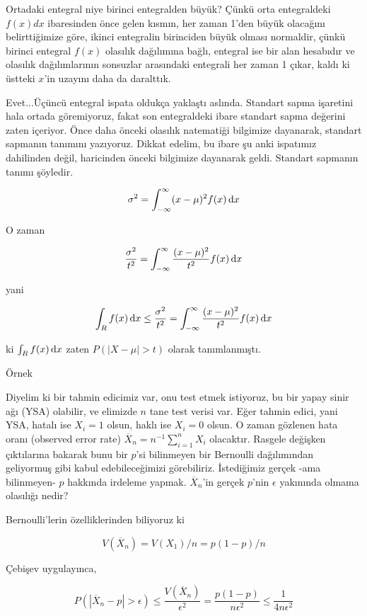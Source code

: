 \documentclass[12pt,fleqn]{article}\usepackage{../../common}
\begin{document}
Ortadaki entegral niye birinci entegralden büyük? Çünkü orta entegraldeki
$f(x)dx$ ibaresinden önce gelen kısmın, her zaman 1'den büyük olacağını
belirttiğimize göre, ikinci entegralin birinciden büyük olması normaldir,
çünkü birinci entegral $f(x)$ olasılık dağılımına bağlı, entegral ise bir
alan hesabıdır ve olasılık dağılımlarının sonsuzlar arasındaki entegrali
her zaman 1 çıkar, kaldı ki üstteki $x$'in uzayını daha da daralttık.

Evet...Üçüncü entegral ispata oldukça yaklaştı aslında. Standart sapma
işaretini hala ortada göremiyoruz, fakat son entegraldeki ibare standart
sapma değerini zaten içeriyor. Önce daha önceki olasılık natematiği
bilgimize dayanarak, standart sapmanın tanımını yazıyoruz. Dikkat edelim,
bu ibare şu anki ispatımız dahilinden değil, haricinden önceki bilgimize
dayanarak geldi. Standart sapmanın tanımı şöyledir.

$$ \sigma^2 = \int_{-\infty}^{\infty} (x-\mu)^2f(x) \,\mathrm{d} x $$

O zaman

$$
\frac{\sigma^2}{t^2}
= \int_{-\infty}^{\infty}\frac{(x-\mu)^2}{t^2}f(x)\,\mathrm{d} x
$$

yani

$$
\int_R f(x) \,\mathrm{d} x \le \frac{\sigma^2}{t^2} = 
\int_{-\infty}^{\infty} \frac{(x-\mu)^2}{t^2}f(x) \,\mathrm{d} x
$$

ki $\int_R f(x) \,\mathrm{d} x$ zaten $P(|X-\mu| > t)$ olarak tanımlanmıştı. 

Örnek

Diyelim ki bir tahmin edicimiz var, onu test etmek istiyoruz, bu bir yapay
sinir ağı (YSA) olabilir, ve elimizde $n$ tane test verisi var. Eğer tahmin
edici, yani YSA, hatalı ise $X_i=1$ olsun, haklı ise $X_i=0$ olsun. O zaman
gözlenen hata oranı (observed error rate)
$\overline{X}_n = n^{-1}\sum _{i=1}^{n} X_i$ olacaktır. Rasgele değişken
çıktılarına bakarak bunu bir $p$'si bilinmeyen bir Bernoulli dağılımından
geliyormuş gibi kabul edebileceğimizi görebiliriz. İstediğimiz gerçek -ama
bilinmeyen- $p$ hakkında irdeleme yapmak. $\overline{X}_n$'in gerçek
$p$'nin $\epsilon$ yakınında olmama olasılığı nedir?

Bernoulli'lerin özelliklerinden biliyoruz ki 

$$ V(\overline{X}_n) = V(X_1) / n = p(1-p)/n$$

Çebişev uygulayınca, 

$$ 
P(|\overline{X}_n - p| > \epsilon) \le \frac{V(\overline{X}_n)}{\epsilon^2}
= \frac{p(1-p)}{n\epsilon^2} \le \frac{1}{4n\epsilon^2}
$$
\end{document}
